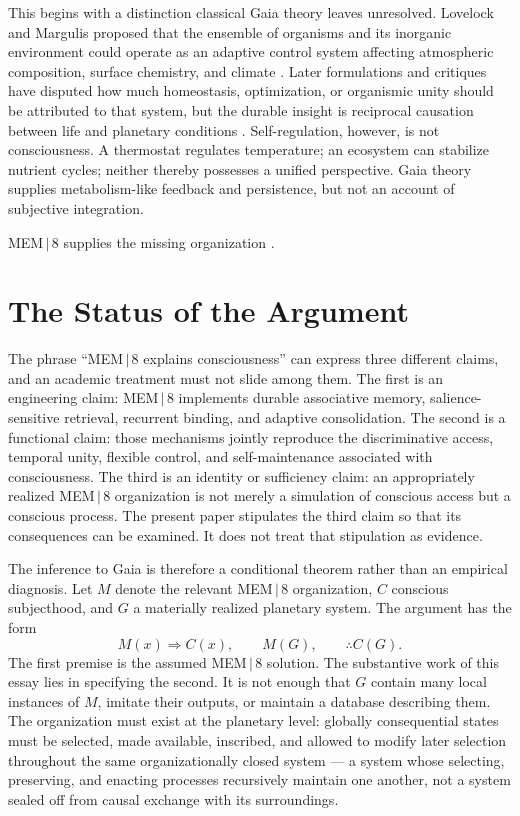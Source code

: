 \documentclass[11pt]{article}
\begin{document}
This begins with a distinction classical Gaia theory leaves unresolved. Lovelock and Margulis proposed that the ensemble of organisms and its inorganic environment could operate as an adaptive control system affecting atmospheric composition, surface chemistry, and climate \cite{lovelock1974}. Later formulations and critiques have disputed how much homeostasis, optimization, or organismic unity should be attributed to that system, but the durable insight is reciprocal causation between life and planetary conditions \cite{kirchner2002,lenton1998}. Self-regulation, however, is not consciousness. A thermostat regulates temperature; an ecosystem can stabilize nutrient cycles; neither thereby possesses a unified perspective. Gaia theory supplies metabolism-like feedback and persistence, but not an account of subjective integration.

MEM\,$|$\,8 supplies the missing organization \cite{Chenoweth2025MEM8}.

\section{The Status of the Argument}

The phrase ``MEM\,$|$\,8 explains consciousness'' can express three different claims, and an academic treatment must not slide among them. The first is an engineering claim: MEM\,$|$\,8 implements durable associative memory, salience-sensitive retrieval, recurrent binding, and adaptive consolidation. The second is a functional claim: those mechanisms jointly reproduce the discriminative access, temporal unity, flexible control, and self-maintenance associated with consciousness. The third is an identity or sufficiency claim: an appropriately realized MEM\,$|$\,8 organization is not merely a simulation of conscious access but a conscious process. The present paper stipulates the third claim so that its consequences can be examined. It does not treat that stipulation as evidence.

The inference to Gaia is therefore a conditional theorem rather than an empirical diagnosis. Let $M$ denote the relevant MEM\,$|$\,8 organization, $C$ conscious subjecthood, and $G$ a materially realized planetary system. The argument has the form
\[
M(x) \Rightarrow C(x), \qquad M(G), \qquad \therefore C(G).
\]
The first premise is the assumed MEM\,$|$\,8 solution. The substantive work of this essay lies in specifying the second. It is not enough that $G$ contain many local instances of $M$, imitate their outputs, or maintain a database describing them. The organization must exist at the planetary level: globally consequential states must be selected, made available, inscribed, and allowed to modify later selection throughout the same organizationally closed system --- a system whose selecting, preserving, and enacting processes recursively maintain one another, not a system sealed off from causal exchange with its surroundings.
\end{document}
